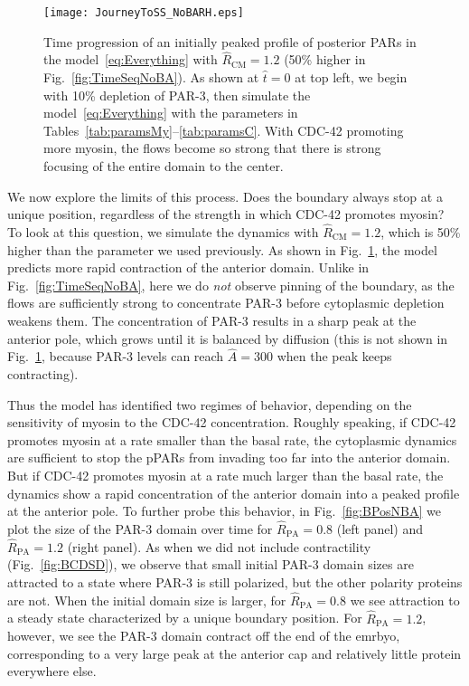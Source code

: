 \documentclass[11pt]{article}
\newcommand{\6}[1]{#1_{\text{6}}}
\newcommand{\3}[1]{#1_{\text{3}}}
\begin{document}
\begin{figure}
\centering
\texttt{[image: JourneyToSS\_NoBARH.eps]}
\caption{\label{fig:TimeSeqNoBARH} Time progression of an initially peaked profile of posterior PARs in the model\ \eqref{eq:Everything} with $\hat R_\text{CM}=1.2$ (50\% higher in Fig.\ \ref{fig:TimeSeqNoBA}). As shown at $\hat t=0$ at top left, we begin with 10\% depletion of PAR-3, then simulate the model\ \eqref{eq:Everything} with the parameters in Tables\ \ref{tab:paramsMy}--\ref{tab:paramsC}. With CDC-42 promoting more myosin, the flows become so strong that there is strong focusing of the entire domain to the center.}
\end{figure}

We now explore the limits of this process. Does the boundary always stop at a unique position, regardless of the strength in which CDC-42 promotes myosin? To look at this question, we simulate the dynamics with $\hat R_\text{CM}=1.2$, which is 50\% higher than the parameter we used previously. As shown in Fig.\ \ref{fig:TimeSeqNoBARH}, the model predicts more rapid contraction of the anterior domain. Unlike in Fig.\ \ref{fig:TimeSeqNoBA}, here we do \emph{not} observe pinning of the boundary, as the flows are sufficiently strong to concentrate PAR-3 before cytoplasmic depletion weakens them. The concentration of PAR-3 results in a sharp peak at the anterior pole, which grows until it is balanced by diffusion (this is not shown in Fig.\ \ref{fig:TimeSeqNoBARH}, because PAR-3 levels can reach $\hat A=300$ when the peak keeps contracting). 

Thus the model has identified two regimes of behavior, depending on the sensitivity of myosin to the CDC-42 concentration. Roughly speaking, if CDC-42 promotes myosin at a rate smaller than the basal rate, the cytoplasmic dynamics are sufficient to stop the pPARs from invading too far into the anterior domain. But if CDC-42 promotes myosin at a rate much larger than the basal rate, the dynamics show a rapid concentration of the anterior domain into a peaked profile at the anterior pole. 
To further probe this behavior, in Fig.\ \ref{fig:BPosNBA} we plot the size of the PAR-3 domain over time for $\hat R_\text{PA}=0.8$ (left panel) and $\hat R_\text{PA}=1.2$ (right panel). As when we did not include contractility (Fig.\ \ref{fig:BCDSD}), we observe that small initial PAR-3 domain sizes are attracted to a state where PAR-3 is still polarized, but the other polarity proteins are not. When the initial domain size is larger, for $\hat R_\text{PA}=0.8$ we see attraction to a steady state characterized by a unique boundary position. For $\hat R_\text{PA}=1.2$, however, we see the PAR-3 domain contract off the end of the emrbyo, corresponding to a very large peak at the anterior cap and relatively little protein everywhere else. 
\end{document}
